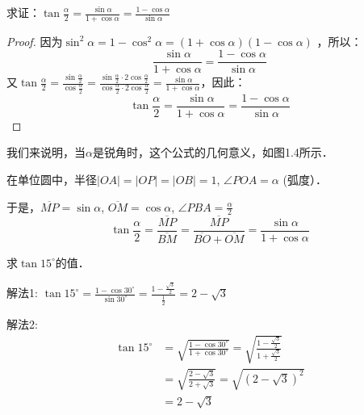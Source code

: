 \begin{example}
    求证：$\tan\frac{\alpha}{2}=\frac{\sin\alpha}{1+\cos\alpha}=\frac{1-\cos\alpha}{\sin\alpha}$
\end{example}
    
\begin{proof}
因为$\sin^2\alpha=1-\cos^2\alpha=(1+\cos \alpha)(1-\cos\alpha)$
，所以：
\[\frac{\sin\alpha}{1+\cos\alpha}=\frac{1-\cos\alpha}{\sin\alpha}\]
又$\tan\frac{\alpha}{2}=\frac{\sin\frac{\alpha}{2}}{\cos \frac{\alpha}{2}}=\frac{\sin\frac{\alpha}{2}\cdot 2\cos \frac{\alpha}{2}}{\cos\frac{\alpha}{2}\cdot 2\cos\frac{\alpha}{2}}=\frac{\sin\alpha}{1+\cos\alpha}$，因此：
\begin{equation}
    \tan\frac{\alpha}{2}=\frac{\sin\alpha}{1+\cos\alpha}=\frac{1-\cos\alpha}{\sin\alpha}
\end{equation}
\end{proof}

我们来说明，当$\alpha$是锐角时，这个公式的几何意义，如图1.4所示．
\begin{figure}[htp]
    \centering
{}
    \caption{}
\end{figure}



在单位圆中，半径$|OA| = |OP| =|OB| =1$, $\angle POA=\alpha$ (弧度）．

于是，$\overline{MP}=\sin\alpha$, $\overline{OM}=\cos\alpha$, $\angle PBA=\frac{\alpha}{2}$
\[\tan\frac{\alpha}{2}=\frac{\overline{MP}}{\overline{BM}}=\frac{\overline{MP}}{\overline{BO}+\overline{OM}}=\frac{\sin\alpha}{1+\cos\alpha}\]

\begin{example}
求$\tan 15^{\circ}$的值．
\end{example}

\begin{solution}
解法1: $\tan 15^{\circ}=\frac{1-\cos30^{\circ}}{\sin 30^{\circ}}=\frac{1-\frac{\sqrt{3}}{2}}{\frac{1}{2}}=2-\sqrt{3}$

解法2: 
\[\begin{split}
  \tan 15^{\circ}&=\sqrt{\frac{1-\cos 30^{\circ}}{1+\cos 30^{\circ}}}=\sqrt{\frac{1-\frac{\sqrt{3}}{2}}{1+\frac{\sqrt{3}}{2}}}\\  
&=\sqrt{\frac{2-\sqrt{3}}{2+\sqrt{3}}}=\sqrt{(2-\sqrt{3})^2}\\
&=2-\sqrt{3}
\end{split}\]    
\end{solution}

